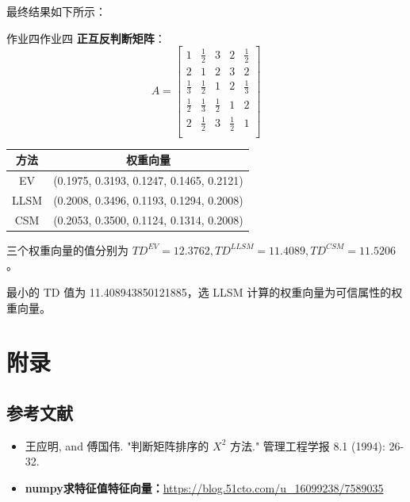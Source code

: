 最终结果如下所示：

\begin{ans}{作业四}{作业四}
  \textbf{正互反判断矩阵}：
  \[
  A = 
  \begin{bmatrix}
  1 & \frac{1}{2} & 3 & 2 & \frac{1}{2} \\
  2 & 1 & 2 & 3 & 2 \\
  \frac{1}{3} & \frac{1}{2} & 1 & 2 & \frac{1}{3} \\
  \frac{1}{2} & \frac{1}{3} & \frac{1}{2} & 1 & 2 \\
  2 & \frac{1}{2} & 3 & \frac{1}{2} & 1 \\
  \end{bmatrix}
  \]
\end{ans}
  
\bigskip
  
\begin{table}[H]
  \centering
  \begin{tabular}{c|c}
  \hline
  方法 & 权重向量 \\
  \hline
  EV   & (0.1975, 0.3193, 0.1247, 0.1465, 0.2121) \\ 
  LLSM & (0.2008, 0.3496, 0.1193, 0.1294, 0.2008) \\
  CSM  & (0.2053, 0.3500, 0.1124, 0.1314, 0.2008) \\
  \hline
  \end{tabular}
\end{table}

\begin{center}
三个权重向量的值分别为 $ TD^{EV} = 12.3762, TD^{LLSM} = 11.4089, TD^{CSM} = 11.5206 $。

最小的 TD 值为 11.408943850121885，选 LLSM 计算的权重向量为可信属性的权重向量。
\end{center}

\section{附录}

\subsection{参考文献}

\begin{itemize}
  \item 王应明, and 傅国伟. "判断矩阵排序的 $X^2$ 方法." 管理工程学报 8.1 (1994): 26-32.
  \item \textbf{numpy求特征值特征向量：}\underline{https://blog.51cto.com/u\_16099238/7589035}
\end{itemize}

